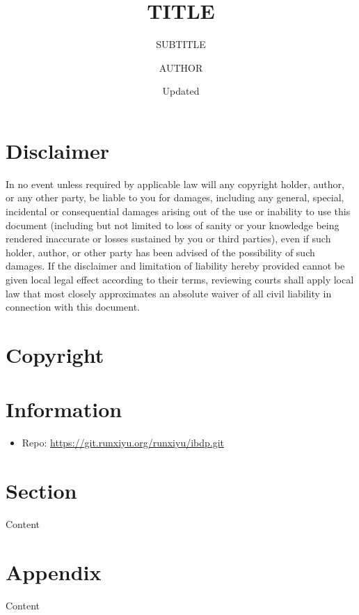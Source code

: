 \documentclass[parskip=half-,twocolumn,twoside]{scrartcl}
\title{TITLE}
\subtitle{SUBTITLE}
\author{AUTHOR}
\date{Updated \DTMnow}
\begin{document}
\subject{SUBJECT}
\maketitle

\section*{Disclaimer}

In no event unless required by applicable law will any copyright holder,
author, or any other party, be liable to you for damages, including
any general, special, incidental or consequential damages arising
out of the use or inability to use this document (including but not
limited to loss of sanity or your knowledge being rendered inaccurate
or losses sustained by you or third parties), even if such holder,
author, or other party has been advised of the possibility of such
damages. If the disclaimer and limitation of liability hereby provided
cannot be given local legal effect according to their terms, reviewing
courts shall apply local law that most closely approximates an absolute
waiver of all civil liability in connection with this document.

\section*{Copyright}

{\small\doclicenseThis}

\section*{Information}
\begin{itemize}
\item Repo: \url{https://git.runxiyu.org/runxiyu/ibdp.git}
\end{itemize}
\newpage\tableofcontents{}

\clearpage{}

\section{Section}

Content

\appendix

\section{Appendix}

Content
\end{document}
